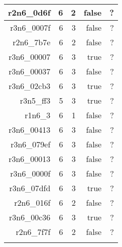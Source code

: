 \begin{center}
\begin{longtable}{rrrrr}
  r2n6\_0d6f & 6 & 2 & false & ? \\ \hline
  r3n6\_0007f & 6 & 3 & false & ? \\ \hline
  r2n6\_7b7e & 6 & 2 & false & ? \\ \hline
  r3n6\_00007 & 6 & 3 & true & ? \\ \hline
  r3n6\_00037 & 6 & 3 & false & ? \\ \hline
  r3n6\_02cb3 & 6 & 3 & true & ? \\ \hline
  r3n5\_ff3 & 5 & 3 & true & ? \\ \hline
  r1n6\_3 & 6 & 1 & false & ? \\ \hline
  r3n6\_00413 & 6 & 3 & false & ? \\ \hline
  r3n6\_079ef & 6 & 3 & false & ? \\ \hline
  r3n6\_00013 & 6 & 3 & false & ? \\ \hline
  r3n6\_0000f & 6 & 3 & false & ? \\ \hline
  r3n6\_07dfd & 6 & 3 & true & ? \\ \hline
  r2n6\_016f & 6 & 2 & false & ? \\ \hline
  r3n6\_00c36 & 6 & 3 & true & ? \\ \hline
  r2n6\_7f7f & 6 & 2 & false & ? \\ \hline
\label{Tab:computational-results} 
\end{longtable}

\end{center}




 
